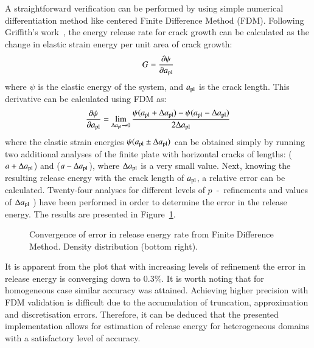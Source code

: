 \documentclass[review]{elsarticle}
\numberwithin{equation}{section}
\begin{document}
A straightforward verification can be performed by using simple numerical differentiation method like centered Finite Difference Method (FDM). Following Griffith's work~\citep{Griffith163}, the energy release rate for crack growth can be calculated as the change in elastic strain energy per unit area of crack growth:
\begin{equation}
G = \frac{\partial \psi}{\partial a_{\rm {pl}}}
\end{equation}
where $\psi$ is the elastic energy of the system, and $a_{\rm{pl}}$ is the crack length. This derivative can be calculated using FDM as:
\begin{equation}
 \frac{\partial \psi}{\partial a_{\rm {pl}}} = \lim_{\Delta a_{\rm {pl}} \to 0} \frac{\psi(a_{\rm {pl}} + \Delta a_{\rm {pl}}) - \psi(a_{\rm {pl}} -\Delta a_{\rm {pl}})}{2\Delta a_{\rm {pl}}}
\end{equation}
where the elastic strain energies $\psi(a_{\rm {pl}} \pm \Delta a_{\rm {pl}})$ can be obtained simply by running two additional analyses of the finite plate with horizontal cracks of lengths: ($a + \Delta a_{\rm {pl}}$) and ($a - \Delta a_{\rm {pl}}$), where $\Delta a_{\rm {pl}}$ is a very small value. 
Next, knowing the resulting release energy with the crack length of $a_{\rm {pl}}$, a relative error can be calculated. 
Twenty-four analyses for different levels of $p$~-~refinements and values of $\Delta a_{\rm {pl}}$ ) have been performed in order to determine the error in the release energy. 
The results are presented in Figure~\ref{fig:covergencefdm}.
\begin{figure}
	\centering
	\caption{Convergence of error in release energy rate from Finite Difference Method. Density distribution (bottom right).}
	\label{fig:covergencefdm}
\end{figure}
It is apparent from the plot that with increasing levels of refinement the error in release energy is converging down to 0.3\%. It is worth noting that for homogeneous case similar accuracy was attained.  Achieving higher precision with FDM validation is difficult due to the accumulation of truncation, approximation and discretisation errors.
Therefore, it can be deduced that the presented implementation allows for estimation of release energy for heterogeneous domains with a satisfactory level of accuracy.
\end{document}
